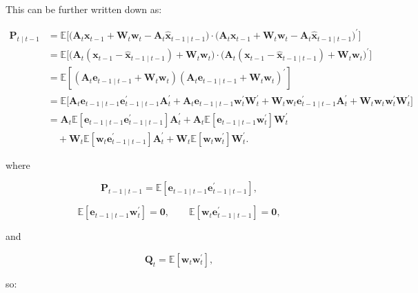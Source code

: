 \documentclass[11pt]{article}
\newcommand{\E}{\mathbb{E}}
\newcommand{\trans}{^{\prime}}
\begin{document}
This can be further written down as:

{\scriptsize
\begin{align*}
\mathbf{P}_{t\mid t-1}
&=
\E\!\Big[
\big(
\mathbf{A}_t\mathbf{x}_{t-1}
+
\mathbf{W}_t\mathbf{w}_t
-
\mathbf{A}_t\widehat{\mathbf{x}}_{t-1\mid t-1}
\big)
\cdot
\big(
\mathbf{A}_t\mathbf{x}_{t-1}
+
\mathbf{W}_t\mathbf{w}_t
-
\mathbf{A}_t\widehat{\mathbf{x}}_{t-1\mid t-1}
\big)\trans
\Big]
\\[0.4em]
&=
\E\!\Big[
\big(
\mathbf{A}_t(\mathbf{x}_{t-1}-\widehat{\mathbf{x}}_{t-1\mid t-1})
+
\mathbf{W}_t\mathbf{w}_t
\big)
\cdot
\big(
\mathbf{A}_t(\mathbf{x}_{t-1}-\widehat{\mathbf{x}}_{t-1\mid t-1})
+
\mathbf{W}_t\mathbf{w}_t
\big)\trans
\Big]
\\[0.4em]
&=
\E\!\left[
\left(
\mathbf{A}_t\mathbf{e}_{t-1\mid t-1}
+
\mathbf{W}_t\mathbf{w}_t
\right)
\left(
\mathbf{A}_t\mathbf{e}_{t-1\mid t-1}
+
\mathbf{W}_t\mathbf{w}_t
\right)\trans
\right]
\\[0.4em]
&=
\E\!\Big[
\mathbf{A}_t\mathbf{e}_{t-1\mid t-1}
\mathbf{e}_{t-1\mid t-1}\trans\mathbf{A}_t\trans
+
\mathbf{A}_t\mathbf{e}_{t-1\mid t-1}\mathbf{w}_t\trans\mathbf{W}_t\trans
+
\mathbf{W}_t\mathbf{w}_t\mathbf{e}_{t-1\mid t-1}\trans\mathbf{A}_t\trans
+
\mathbf{W}_t\mathbf{w}_t\mathbf{w}_t\trans\mathbf{W}_t\trans
\Big]
\\[0.4em]
&=
\mathbf{A}_t\E\!\left[
\mathbf{e}_{t-1\mid t-1}\mathbf{e}_{t-1\mid t-1}\trans
\right]\mathbf{A}_t\trans
+
\mathbf{A}_t\E\!\left[
\mathbf{e}_{t-1\mid t-1}\mathbf{w}_t\trans
\right]\mathbf{W}_t\trans
\\
&\quad+
\mathbf{W}_t\E\!\left[
\mathbf{w}_t\mathbf{e}_{t-1\mid t-1}\trans
\right]\mathbf{A}_t\trans
+
\mathbf{W}_t\E\!\left[
\mathbf{w}_t\mathbf{w}_t\trans
\right]\mathbf{W}_t\trans.
\end{align*}
}

where

\[
\mathbf{P}_{t-1\mid t-1}
=
\E\!\left[
\mathbf{e}_{t-1\mid t-1}\mathbf{e}_{t-1\mid t-1}\trans
\right],
\]

\[
\E\!\left[
\mathbf{e}_{t-1\mid t-1}\mathbf{w}_t\trans
\right]
=
\mathbf{0},
\qquad
\E\!\left[
\mathbf{w}_t\mathbf{e}_{t-1\mid t-1}\trans
\right]
=
\mathbf{0},
\]

and

\[
\mathbf{Q}_t
=
\E\!\left[
\mathbf{w}_t\mathbf{w}_t\trans
\right],
\]

so:
\end{document}
